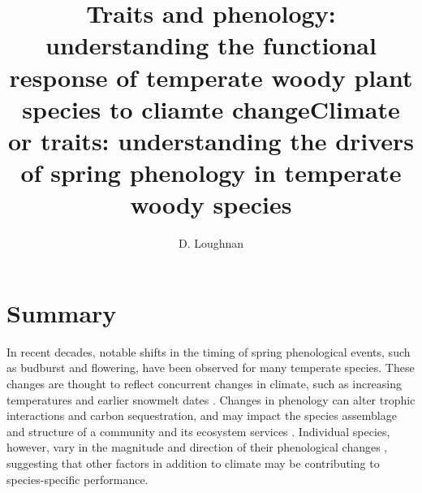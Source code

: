 \documentclass{article}\usepackage[]{graphicx}\usepackage[]{color}
\begin{document}

\title{Traits and phenology: understanding the functional response of temperate woody plant species to cliamte change} %

\title{Climate or traits: understanding the drivers of spring phenology in temperate woody species}

\author{D. Loughnan}
\maketitle  %


\section*{Summary}

\par In recent decades, notable shifts in the timing of spring phenological events, such as budburst and flowering, have been observed for many temperate species. These changes are thought to reflect concurrent changes in climate, such as increasing temperatures and earlier snowmelt dates \cite{ Anderson2012}. Changes in phenology can alter trophic interactions and carbon sequestration, and may impact the species assemblage and structure of a community and its ecosystem services \cite{Kharouba2018, Cleland:2007}. Individual species, however, vary in the magnitude and direction of their phenological changes \cite{Fitter2002,Dunnell2011, Konig2018}, suggesting that other factors in addition to climate may be contributing to species-specific performance.
\end{document}
